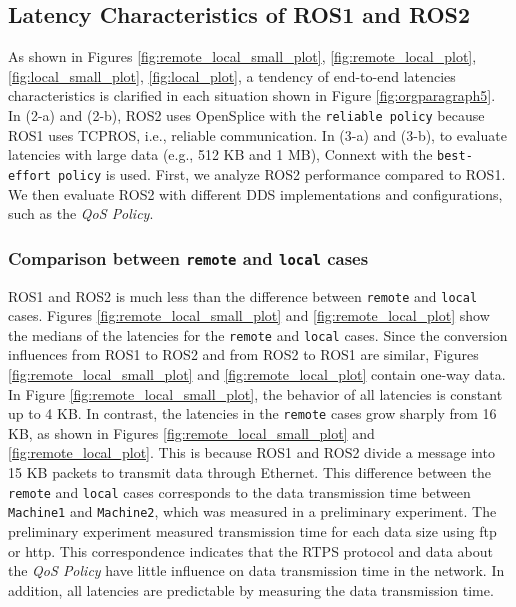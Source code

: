 \documentclass{sig-alternate-05-2015}
\begin{document}
\vspace{-2mm}
\subsection{Latency Characteristics of ROS1 and ROS2}
\label{sec:latency}

As shown in Figures \ref{fig:remote_local_small_plot}, \ref{fig:remote_local_plot}, \ref{fig:local_small_plot}, \ref{fig:local_plot}, a tendency of end-to-end latencies characteristics is clarified in each situation shown in Figure \ref{fig:orgparagraph5}.
In (2-a) and (2-b), ROS2 uses OpenSplice with the \texttt{reliable policy}  because ROS1 uses TCPROS, i.e., reliable communication.
In (3-a) and (3-b), to evaluate latencies with large data (e.g., 512 KB and 1 MB), Connext with the \texttt{best-effort policy} is used.
First, we analyze ROS2 performance compared to ROS1.
We then evaluate ROS2 with different DDS implementations and configurations, such as the \emph{QoS Policy}.

\vspace{-2mm}
\subsubsection{Comparison between \texttt{remote} and \texttt{local} cases}
\label{sec:remote_local}
ROS1 and ROS2 is much less than the difference between \texttt{remote} and \texttt{local} cases.
Figures \ref{fig:remote_local_small_plot} and \ref{fig:remote_local_plot} show the medians of the latencies for the \texttt{remote} and \texttt{local} cases.
Since the conversion influences from ROS1 to ROS2 and from ROS2 to ROS1 are similar, Figures \ref{fig:remote_local_small_plot} and \ref{fig:remote_local_plot} contain one-way data.
In Figure \ref{fig:remote_local_small_plot}, the behavior of all latencies is constant up to 4 KB.
In contrast, the latencies in the \texttt{remote} cases grow sharply from 16 KB, as shown in Figures \ref{fig:remote_local_small_plot} and \ref{fig:remote_local_plot}.
This is because ROS1 and ROS2 divide a message into 15 KB packets to transmit data through Ethernet.
This difference between the \texttt{remote} and \texttt{local} cases corresponds to the data transmission time between \texttt{Machine1} and \texttt{Machine2}, which was measured in a preliminary experiment. The preliminary experiment measured transmission time for each data size using ftp or http.
This correspondence indicates that the RTPS protocol and data about the \emph{QoS Policy} have little influence on data transmission time in the network.
In addition, all latencies are predictable by measuring the data transmission time.
\end{document}
